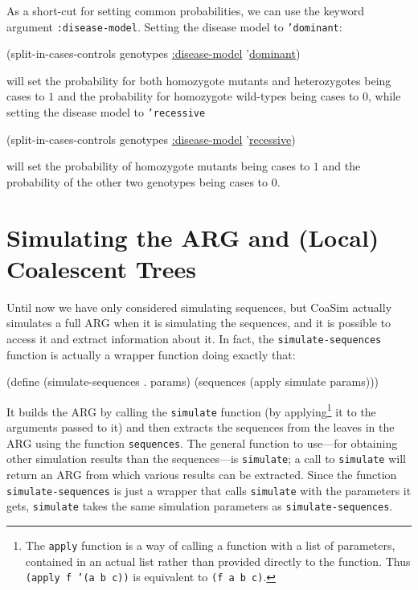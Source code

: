 \documentclass{manual}
\begin{document}
As a short-cut for setting common probabilities, we can use the
keyword argument \texttt{:disease-model}.  Setting the disease model
to \texttt{'dominant}:
\begin{code}
(split-in-cases-controls genotypes \underline{:disease-model} '\underline{dominant})
\end{code}
will set the probability for both homozygote mutants and heterozygotes
being cases to $1$ and the probability for homozygote wild-types being
cases to $0$, while setting the disease model to \texttt{'recessive}
\begin{code}
(split-in-cases-controls genotypes \underline{:disease-model} '\underline{recessive})
\end{code}
will set the probability of homozygote mutants being cases to $1$ and
the probability of the other two genotypes being cases to $0$.



\section{Simulating the ARG and (Local) Coalescent Trees}
\label{sec:simul-coal-trees}

Until now we have only considered simulating sequences, but CoaSim
actually simulates a full ARG when it is simulating the sequences, and
it is possible to access it and extract information about it.  In
fact, the \texttt{simulate-sequences} function is actually a wrapper
function doing exactly that:
\begin{code}
(define (simulate-sequences . params)
  (sequences (apply simulate params)))
\end{code}
It builds the ARG by calling the \texttt{simulate} function (by
applying\footnote{The \texttt{apply} function is a way of
  calling a function with a list of parameters, contained in an actual
  list rather than provided directly to the function.  Thus
  \texttt{(apply f '(a b c))} is equivalent to \texttt{(f a b c)}.} it
to the arguments passed to it) and then extracts the sequences from
the leaves in the ARG using the function \texttt{sequences}.  The
general function to use---for obtaining other simulation results than
the sequences---is \texttt{simulate}; a call to \texttt{simulate} will
return an ARG from which various results can be extracted.  Since the
function \texttt{simulate-sequences} is just a wrapper that calls
\texttt{simulate} with the parameters it gets, 
\texttt{simulate} takes the same simulation parameters as
\texttt{simulate-sequences}.
\end{document}

